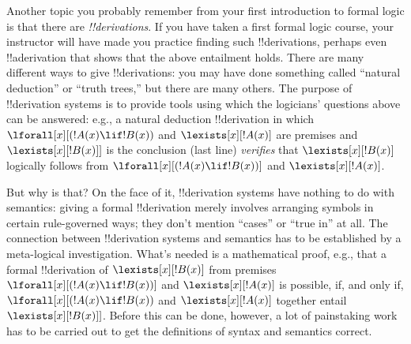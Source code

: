 \documentclass[../../../include/open-logic-section]{subfiles}
\begin{document}
Another topic you probably remember from your first introduction to
formal logic is that there are \emph{!!{derivation}s}.  If you have
taken a first formal logic course, your instructor will have made you
practice finding such !!{derivation}s, perhaps even !!a{derivation}
that shows that the above entailment holds.  There are many different
ways to give !!{derivation}s: you may have done something called
``natural deduction'' or ``truth trees,'' but there are many others.
The purpose of !!{derivation} systems is to provide tools using which the
logicians' questions above can be answered: e.g., a natural deduction
!!{derivation} in which $\lforall[x][(!A(x) \lif !B(x))$ and
$\lexists[x][!A(x)]$ are premises and $\lexists[x][!B(x)]]$ is the
conclusion (last line) \emph{verifies} that $\lexists[x][!B(x)]$
logically follows from $\lforall[x][(!A(x) \lif !B(x))]$ and
$\lexists[x][!A(x)]$.  

But why is that?  On the face of it, !!{derivation} systems have nothing to do
with semantics: giving a formal !!{derivation} merely involves arranging symbols
in certain rule-governed ways; they don't mention ``cases'' or ``true
in'' at all.  The connection between !!{derivation} systems and semantics has
to be established by a meta-logical investigation. What's needed is a
mathematical proof, e.g., that a formal !!{derivation} of $\lexists[x][!B(x)]$
from premises $\lforall[x][(!A(x) \lif !B(x))]$ and
$\lexists[x][!A(x)]$ is possible, if, and only if, $\lforall[x][(!A(x)
\lif !B(x))$ and $\lexists[x][!A(x)]$ together
entail~$\lexists[x][!B(x)]]$.  Before this can be done, however, a
lot of painstaking work has to be carried out to get the definitions
of syntax and semantics correct.
\end{document}

